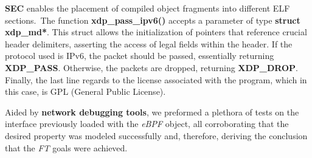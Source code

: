 \textbf{SEC} enables the placement of compiled object fragments into different ELF sections.\
The function \textbf{xdp\_pass\_ipv6()} accepts a parameter of type \textbf{struct xdp\_md*}.
This struct allows the initialization of pointers that reference crucial header delimiters, asserting the access of legal fields within the header.
If the protocol used is IPv6, the packet should be passed, essentially returning \textbf{XDP\_PASS}.
Otherwise, the packets are dropped, returning \textbf{XDP\_DROP}.
Finally, the last line regards to the license associated with the program, which in this case, is GPL (General Public License).

Aided by \textbf{network debugging tools}, we preformed a plethora of tests on the interface previously loaded with the \textit{eBPF} object, all corroborating that the desired property was modeled successfully and, therefore, deriving the conclusion that the \textit{FT} goals were achieved.
